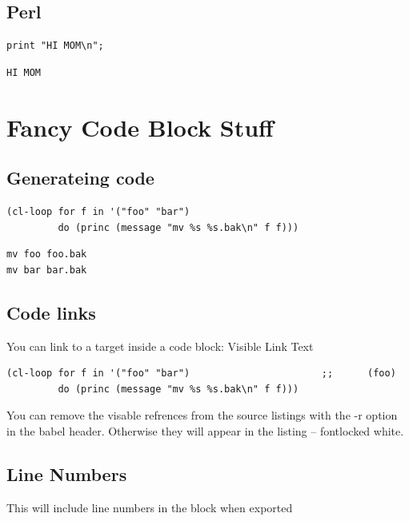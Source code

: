 \documentclass[11pt]{article}
\begin{document}
\subsection{Perl}
\label{sec:orgd9ae186}

\begin{verbatim}
print "HI MOM\n";
\end{verbatim}

\begin{verbatim}
HI MOM
\end{verbatim}

\section{Fancy Code Block Stuff}
\label{sec:orgadb7932}
\subsection{Generateing code}
\label{sec:org175b01c}

\begin{verbatim}
(cl-loop for f in '("foo" "bar")
         do (princ (message "mv %s %s.bak\n" f f)))
\end{verbatim}

\begin{verbatim}
mv foo foo.bak
mv bar bar.bak
\end{verbatim}

\subsection{Code links}
\label{sec:orgb0eaeec}

You can link to a target inside a code block: Visible Link Text

\begin{verbatim}
(cl-loop for f in '("foo" "bar")                       ;;      (foo)
         do (princ (message "mv %s %s.bak\n" f f)))
\end{verbatim}

You can remove the visable refrences from the source listings with the -r option in the babel header.  Otherwise they will appear in the listing -- fontlocked
white.

\subsection{Line Numbers}
\label{sec:orgd095d05}

This will include line numbers in the block when exported
\end{document}
